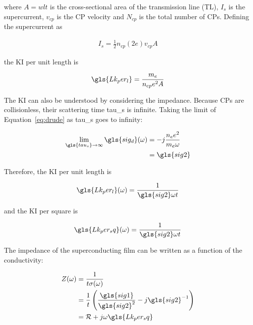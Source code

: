 where $A = wlt$ is the cross-sectional area of the transmission line (TL), $I_{s}$ is the supercurrent, $v_{cp}$ is the CP velocity and $N_{cp}$ is the total number of CPs. Defining the supercurrent as

\begin{equation}
  \begin{aligned}
  I_{s} = \frac{1}{2}n_{cp}(2e)v_{cp}A
  \end{aligned}
\end{equation}

the KI per unit length is

\begin{equation} \label{eq:KI_per_length}
  \gls{Lk_per_l} = \frac{m_{e}}{n_{cp}e^{2}A}
\end{equation}

The KI can also be understood by considering the impedance. Because CPs are collisionless, their scattering time \gls{tau_s} is infinite. Taking the limit of Equation~\ref{eq:drude} as \gls{tau_s} goes to infinity:

\begin{equation}
    \begin{aligned}
    \lim_{\gls{tau_s} \to \infty} \gls{sig_d}(\omega) &= -j\frac{n_{e}e^{2}}{m_{e}\omega}\\
    &= \gls{sig2}
    \end{aligned}
\end{equation}

Therefore, the KI per unit length is

\begin{equation}
  \gls{Lk_per_l}(\omega) = \frac{1}{\gls{sig2}\omega t}
\end{equation}

and the KI per square is

\begin{equation}
  \gls{Lk_per_sq}(\omega) = \frac{1}{\gls{sig2}\omega t}
\end{equation}

The impedance of the superconducting film can be written as a function of the conductivity:

\begin{equation}\label{eq:Z}
  \begin{aligned}
  Z(\omega) &= \frac{1}{t\sigma(\omega)}\\
            &= \frac{1}{t}\left( \frac{\gls{sig1}}{\gls{sig2}^{2}} - j\gls{sig2}^{-1}\right)\\
            &= \mathcal{R} + j\omega\gls{Lk_per_sq}
  \end{aligned}
\end{equation}

